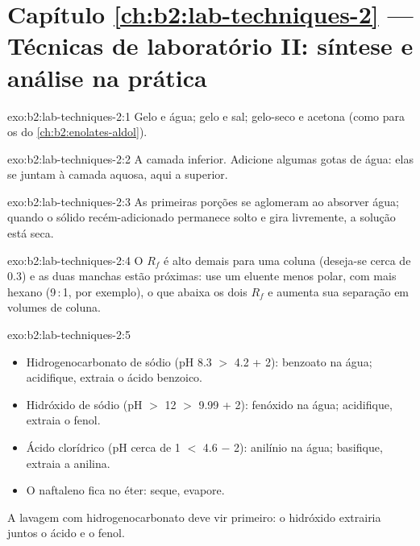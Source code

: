 \section*{Capítulo \ref{ch:b2:lab-techniques-2} --- Técnicas de laboratório II: síntese e análise na prática}

\begin{solution}{exo:b2:lab-techniques-2:1}
Gelo e água; gelo e sal; gelo-seco e acetona (como para os  do \cref{ch:b2:enolates-aldol}).
\end{solution}

\begin{solution}{exo:b2:lab-techniques-2:2}
A camada inferior. Adicione algumas gotas de água: elas se juntam à camada aquosa, aqui a superior.
\end{solution}

\begin{solution}{exo:b2:lab-techniques-2:3}
As primeiras porções se aglomeram ao absorver água; quando o sólido recém-adicionado permanece solto e
gira livremente, a solução está seca.
\end{solution}

\begin{solution}{exo:b2:lab-techniques-2:4}
O $R_f$ é alto demais para uma coluna (deseja-se cerca de 0.3) e as duas manchas estão próximas: use um
eluente menos polar, com mais hexano (9\,:\,1, por exemplo), o que abaixa os dois $R_f$ e aumenta sua
separação em volumes de coluna.
\end{solution}

\begin{solution}{exo:b2:lab-techniques-2:5}
\begin{itemize}
  \item Hidrogenocarbonato de sódio (pH 8.3 $>$ 4.2 + 2): benzoato na água; acidifique, extraia o ácido benzoico.
  \item Hidróxido de sódio (pH $>$ 12 $>$ 9.99 + 2): fenóxido na água; acidifique, extraia o fenol.
  \item Ácido clorídrico (pH cerca de 1 $<$ 4.6 $-$ 2): anilínio na água; basifique, extraia a anilina.
  \item O naftaleno fica no éter: seque, evapore.
\end{itemize}
A lavagem com hidrogenocarbonato deve vir primeiro: o hidróxido extrairia juntos o ácido e o fenol.
\end{solution}

